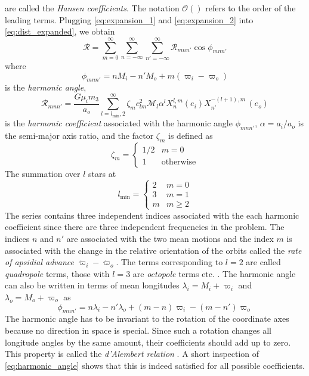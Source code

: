 \documentclass[twoside,openright,titlepage,numbers=noenddot,headinclude,%
                footinclude=true,cleardoublepage=empty,abstractoff, 
                BCOR=5mm,paper=a4,fontsize=11pt,%
                american,%
                ]{scrreprt}%
\begin{document}
are called the \emph{Hansen coefficients}. The notation $\mathcal{O}()$
refers to the order of the leading terms. Plugging \cref{eq:expansion_1}
and \cref{eq:expansion_2} into \cref{eq:dist_expanded}, we obtain
\citep{Mardling2013}
\begin{equation}
    \mathcal{R}=\sum^\infty_{m=0}\sum^\infty_{n=-\infty}\sum^\infty_{n'=-\infty}
    \mathcal{R}_{mnn'}\cos\phi_{mnn'}
    \label{eq:disturbing_function}
\end{equation}
where 
\begin{equation}
    \phi_{mnn'}=nM_i-n'M_o+m(\varpi_i-\varpi_o)
\end{equation}
is the \emph{harmonic angle},
\begin{equation}
    \mathcal{R}_{mnn'}= \frac{G\mu_im_3}{a_o} \sum^\infty_{l=l_\text{min},2}
    \zeta_m c_{lm}^2 \mathcal{M}_l\alpha^l X^{l,m}_n(e_i)X^{-(l+1),m}_{n'}\,(e_o)
    \label{eq:harmonic_coefficient}
\end{equation}
is the \emph{harmonic coefficient} associated with the harmonic angle
$\phi_{mnn'}$, $\alpha=a_i/a_o$ is the semi-major axis ratio, 
and the factor $\zeta_m$ is defined as
\begin{equation}
    \zeta_m=
    \begin{cases}
        1/2 & m=0\\
        1 & \text{otherwise}
    \end{cases}
\end{equation}
The summation over $l$ stars at
\begin{equation}
    l_\text{min}=
    \begin{cases}
        2 & m=0\\
        3 & m=1\\
        m & m\geq 2
    \end{cases}
\end{equation}
The series contains three independent indices associated with the each 
harmonic coefficient since there are three independent frequencies in the 
problem. The indices $n$ and $n'$ are associated with the  two mean 
motions and the index $m$ is associated with the change in the
relative orientation of the orbits called the 
\emph{rate of apsidial advance} $\dot{\varpi}_i-\dot{\varpi}_o$. 
The terms corresponding to $l=2$ are called \emph{quadropole} 
terms, those with $l=3$ are \emph{octopole} terms etc. . The harmonic
angle can also be written in terms of mean longitudes $\lambda_i=M_i+\varpi_i$
and $\lambda_o=M_o+\varpi_o$ as
\begin{equation}
    \phi_{mnn'}=n\lambda_i-n'\lambda_o+(m-n)\varpi_i-(m-n')\varpi_o
    \label{eq:harmonic_angle}
\end{equation}
The harmonic angle has to be invariant to the rotation of the coordinate axes 
because no direction in space is special.
Since such a rotation changes all longitude angles by the same amount, their 
coefficients should add up to zero. This property is called the 
\emph{d'Alembert relation} \citep{murray}. A short inspection of 
\cref{eq:harmonic_angle} shows that this is indeed satisfied for all possible
coefficients.
\end{document}
